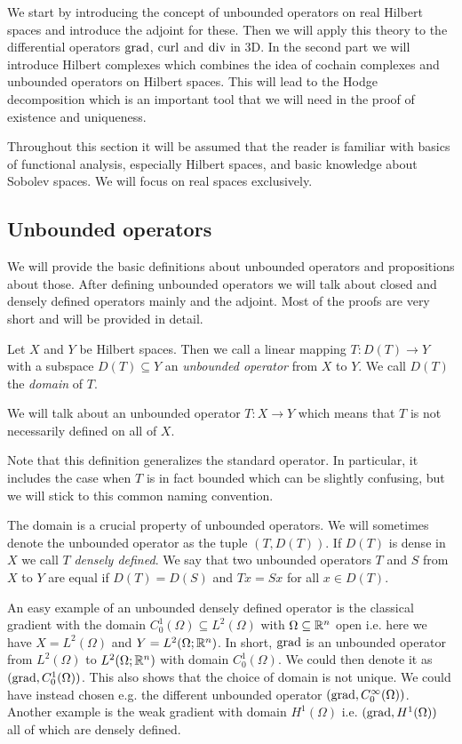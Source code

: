 \documentclass[../main.tex]{subfiles}
\begin{document}
We start by introducing the concept of unbounded operators on real Hilbert spaces and 
introduce the adjoint for these. Then we will apply this theory to 
the differential operators $\operatorname{grad}$, $\operatorname{curl}$ and $\operatorname{div}$ in 3D. In the 
second part we will introduce Hilbert complexes which combines the idea 
of cochain complexes and unbounded operators on Hilbert spaces. This will lead to the 
Hodge decomposition which is an important tool that we will need in the proof of 
existence and uniqueness.

Throughout this section 
it will be assumed that the reader is familiar with basics of functional analysis, 
especially Hilbert spaces, 
and basic knowledge about Sobolev spaces. We will focus on real spaces 
exclusively.

\subsection{Unbounded operators}\label{sec:unbounded_operators}

We will provide the basic definitions about unbounded operators and propositions 
about those. After defining unbounded operators we will talk about closed and 
densely defined operators mainly and the adjoint. 
Most of the proofs are very short and will be provided in detail. 

\begin{definition}
    Let $X$ and $Y$ be Hilbert spaces. Then we call a linear mapping 
    $T: D(T) \rightarrow Y$ with a subspace $D(T) \subseteq Y$ an 
    \textit{unbounded 
    operator} from $X$ to $Y$. We call $D(T)$ the \textit{domain} of $T$.
\end{definition}
We will talk about an unbounded operator $T:X \rightarrow Y$ 
which means that $T$ is not necessarily defined on all of $X$. 

Note that this definition generalizes the standard operator. In particular, 
it includes the case when $T$ is in fact bounded which can be 
slightly confusing, but we will stick to this common naming convention. 

The domain is a crucial property of unbounded operators. We will sometimes 
denote the unbounded operator as the tuple $(T,D(T))$.
If $D(T)$ is dense in $X$ we call $T$ \textit{densely defined}. 
We say that two unbounded operators $T$ and $S$ from $X$ to $Y$ are equal 
if $D(T) = D(S)$ and $Tx = Sx$ for all $x\in D(T)$.

An easy
example of an unbounded densely defined operator is the classical gradient with 
the domain $C_0^1(\Omega) \subseteq L^2 (\Omega)$ 
with $\Omega \subseteq \mathbb{R}^n$ open i.e. here we have $X=L^2(\Omega)$ and 
$Y=L^2(\Omega;\mathbb{R}^n)$.
In short, $\operatorname{grad}$ is an unbounded operator from $L^2(\Omega)$ to 
$L^2(\Omega;\mathbb{R}^n)$ with domain $C_0^1(\Omega)$.
We could then denote it as $(\operatorname{grad}, C_0^1(\Omega))$. This also shows that 
the choice of domain is not unique. We could have instead chosen e.g. the 
different unbounded operator $(\operatorname{grad}, C_0^\infty (\Omega))$. 
Another example is the weak gradient with domain $H^1(\Omega)$ i.e.
$(\operatorname{grad}, H^1(\Omega))$ all of which are densely defined.
\end{document}
